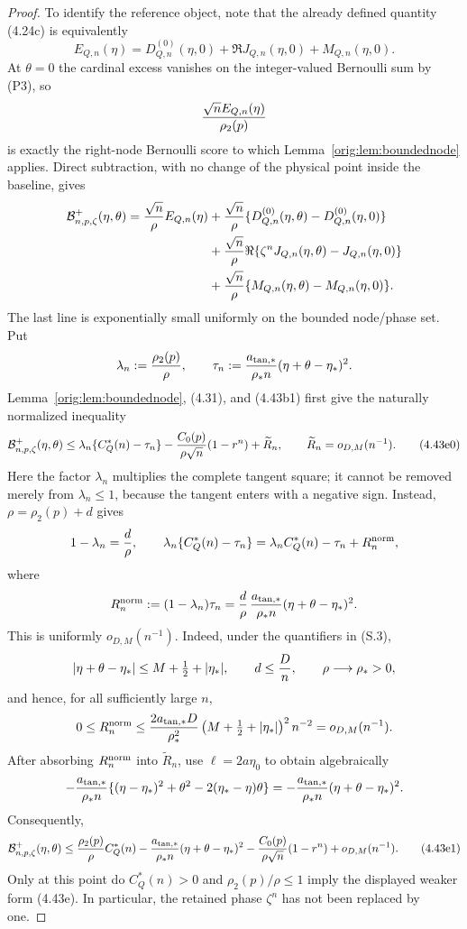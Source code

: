\documentclass[11pt,a4paper]{article}
\numberwithin{equation}{section}
\theoremstyle{definition}
\theoremstyle{remark}
\begin{document}
\begin{proof}
To identify the reference object, note that the already defined quantity
(4.24c) is equivalently
\[
 E_{Q,n}(\eta)=D^{(0)}_{Q,n}(\eta,0)
       +\Re J_{Q,n}(\eta,0)+M_{Q,n}(\eta,0).
\]
At $\theta=0$ the cardinal excess vanishes on the integer-valued Bernoulli
sum by (P3), so
\[
 {\sqrt n E_{Q,n}(\eta)\over\rho_2(p)}
\]
is exactly the right-node Bernoulli score to which
Lemma~\ref{orig:lem:boundednode} applies.  Direct
subtraction, with no change of the physical point inside the baseline,
gives
\begin{align*}
 \mathcal B^+_{n,p,\zeta}(\eta,\theta)
 ={\sqrt n\over\rho}E_{Q,n}(\eta)
 &+{\sqrt n\over\rho}\{D^{(0)}_{Q,n}(\eta,\theta)
                         -D^{(0)}_{Q,n}(\eta,0)\}\\
 &+{\sqrt n\over\rho}\Re\{\zeta^nJ_{Q,n}(\eta,\theta)
                         -J_{Q,n}(\eta,0)\}\\
 &+{\sqrt n\over\rho}\{M_{Q,n}(\eta,\theta)
                         -M_{Q,n}(\eta,0)\}.
\end{align*}
The last line is exponentially small uniformly on the bounded node/phase
set.  Put
\[
 \lambda_n:={\rho_2(p)\over\rho},\qquad
 \tau_n:={a_{\rm tan,*}\over\rho_*n}
              (\eta+\theta-\eta_*)^2 .
\]
Lemma~\ref{orig:lem:boundednode}, (4.31), and (4.43b1) first give the naturally
normalized inequality
\[
 \mathcal B^+_{n,p,\zeta}(\eta,\theta)
 \le \lambda_n\{C_Q^*(n)-\tau_n\}
 -{C_0(p)\over\rho\sqrt n}(1-r^n)
 +\widetilde R_n,
 \qquad \widetilde R_n=o_{D,M}(n^{-1}).                  \tag{4.43e0}
\]
Here the factor $\lambda_n$ multiplies the complete tangent square; it
cannot be removed merely from $\lambda_n\le1$, because the tangent enters
with a negative sign.  Instead, $\rho=\rho_2(p)+d$ gives
\[
 1-\lambda_n={d\over\rho},
 \qquad
 \lambda_n\{C_Q^*(n)-\tau_n\}
 =\lambda_n C_Q^*(n)-\tau_n+R_n^{\rm norm},
\]
where
\[
 R_n^{\rm norm}:=(1-\lambda_n)\tau_n
 ={d\over\rho}\,{a_{\rm tan,*}\over\rho_*n}
       (\eta+\theta-\eta_*)^2 .
\]
This is uniformly $o_{D,M}(n^{-1})$.  Indeed, under the quantifiers in
(S.3),
\[
 |\eta+\theta-\eta_*|
 \le M+\tfrac12+|\eta_*|,\qquad d\le {D\over n},
 \qquad \rho\longrightarrow\rho_*>0,
\]
and hence, for all sufficiently large $n$,
\[
 0\le R_n^{\rm norm}
 \le {2a_{\rm tan,*}D\over\rho_*^2}
       \left(M+\tfrac12+|\eta_*|\right)^2 n^{-2}
 =o_{D,M}(n^{-1}).
\]
After absorbing $R_n^{\rm norm}$ into $\widetilde R_n$, use
$\ell=2a\eta_0$ to obtain algebraically
\[
 -{a_{\rm tan,*}\over\rho_*n}\{(\eta-\eta_*)^2+\theta^2
                  -2(\eta_* -\eta)\theta\}
 =-{a_{\rm tan,*}\over\rho_*n}(\eta+\theta-\eta_*)^2.
\]
Consequently,
\[
 \mathcal B^+_{n,p,\zeta}(\eta,\theta)
 \le {\rho_2(p)\over\rho}C_Q^*(n)
 -{a_{\rm tan,*}\over\rho_*n}(\eta+\theta-\eta_*)^2
 -{C_0(p)\over\rho\sqrt n}(1-r^n)+o_{D,M}(n^{-1}).   \tag{4.43e1}
\]
Only at this point do $C_Q^*(n)>0$ and $\rho_2(p)/\rho\le1$ imply the
displayed weaker form (4.43e).  In particular, the retained phase $\zeta^n$
has not been replaced by one.


\end{proof}
\end{document}

